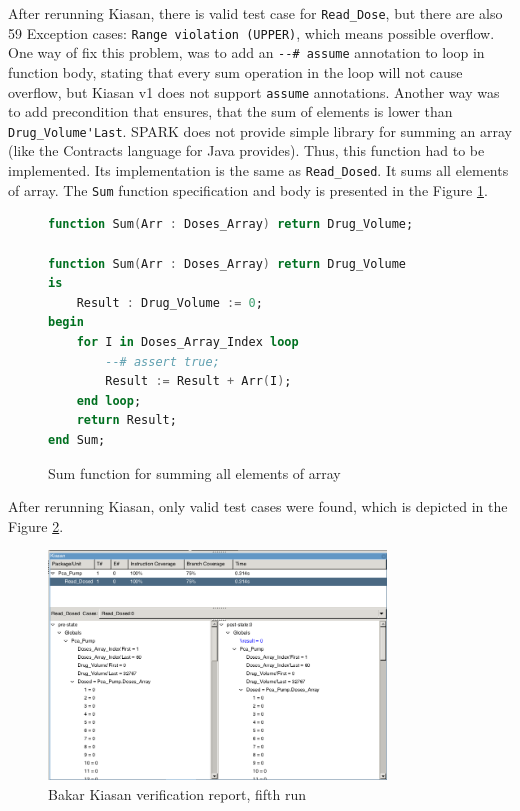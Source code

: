 After rerunning Kiasan, there is valid test case for \lstinline{Read_Dose}, but there are also 59 Exception cases: \lstinline{Range violation (UPPER)}, which means possible overflow. One way of fix this problem, was to add an \lstinline{--# assume} annotation to loop in function body, stating that every sum operation in the loop will not cause overflow, but Kiasan v1 does not support \lstinline{assume} annotations. Another way was to add precondition that ensures, that the sum of elements is lower than \lstinline{Drug_Volume'Last}. SPARK does not provide simple library for summing an array (like the Contracts language for Java provides). Thus, this function had to be implemented. Its implementation is the same as \lstinline{Read_Dosed}. It sums all elements of array. The \lstinline{Sum} function specification and body is presented in the Figure \ref{listing:sum_function}.

\begin{figure}
\singlespacing
\begin{lstlisting}[language=ada, frame=single, gobble=0]
function Sum(Arr : Doses_Array) return Drug_Volume;

function Sum(Arr : Doses_Array) return Drug_Volume
is
    Result : Drug_Volume := 0;
begin
    for I in Doses_Array_Index loop
        --# assert true;
        Result := Result + Arr(I);
    end loop;
    return Result;
end Sum;
\end{lstlisting}
\doublespacing
\caption{Sum function for summing all elements of array}
\label{listing:sum_function}
\end{figure}

After rerunning Kiasan, only valid test cases were found, which is depicted in the Figure \ref{figure:sparkverification:kiasanreport5}.

\begin{figure}[ht]%
    \begin{center}
        \includegraphics[width=0.8\textwidth]{figures/pca-pump-verification-step5.png}        
    \end{center}
    \caption{Bakar Kiasan verification report, fifth run}
    \label{figure:sparkverification:kiasanreport5}
\end{figure}

